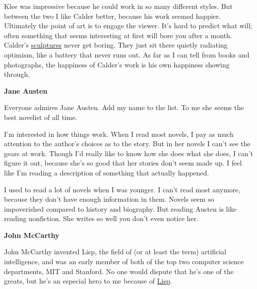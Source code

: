 Klee was impressive because he
                  could work in so many different styles. But between the two I
                  like Calder better, because his work seemed happier.
                  Ultimately the point of art is to engage the viewer. It's hard
                  to predict what will; often something that seems interesting
                  at first will bore you after a month. Calder's
                  \href{https://www.flickr.com/photos/uergevich/7029234689/}{sculptures}
                  never get boring. They just sit there quietly radiating
                  optimism, like a battery that never runs out. As far as I can
                  tell from books and photographs, the happiness of Calder's
                  work is his own happiness showing through.


                  \textbf{Jane Austen}

Everyone admires Jane Austen.
                  Add my name to the list. To me she seems the best novelist of
                  all time.

I'm interested in how things work. When I
                  read most novels, I pay as much attention to the author's
                  choices as to the story. But in her novels I can't see the
                  gears at work. Though I'd really like to know how she does
                  what she does, I can't figure it out, because she's so good
                  that her stories don't seem made up. I feel like I'm reading a
                  description of something that actually happened.

I
                  used to read a lot of novels when I was younger. I can't read
                  most anymore, because they don't have enough information in
                  them. Novels seem so impoverished compared to history and
                  biography. But reading Austen is like reading nonfiction. She
                  writes so well you don't even notice her.


                  \textbf{John McCarthy}

John McCarthy invented Lisp,
                  the field of (or at least the term) artificial intelligence,
                  and was an early member of both of the top two computer
                  science departments, MIT and Stanford. No one would dispute
                  that he's one of the greats, but he's an especial hero to me
                  because of
                  \href{http://www.paulgraham.com/rootsoflisp.html}{Lisp}.

